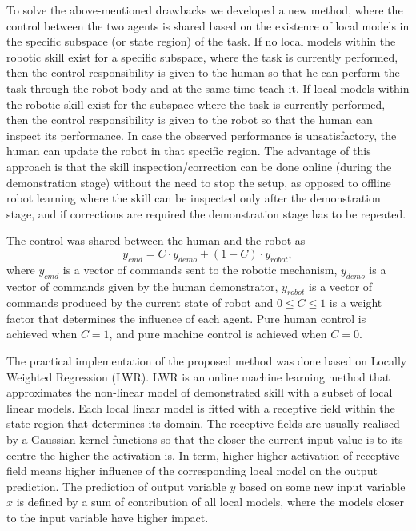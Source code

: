 To solve the above-mentioned drawbacks we developed a new method, where the control between the two agents is shared based on the existence of local models in the specific subspace (or state region) of the task. If no local models within the robotic skill exist for a specific subspace, where the task is currently performed, then the control responsibility is given to the human so that he can perform the task through the robot body and at the same time teach it. If local models within the robotic skill exist for the subspace where the task is currently performed, then the control responsibility is given to the robot so that the human can inspect its performance. In case the observed performance is unsatisfactory, the human can update the robot in that specific region. The advantage of this approach is that the skill inspection/correction can be done online (during the demonstration stage) without the need to stop the setup, as opposed to offline robot learning where the skill can be inspected only after the demonstration stage, and if corrections are required the demonstration stage has to be repeated.

The control was shared between the human and the robot as \cite{Peternel2013}
\begin{equation}
y_{cmd} = C \cdot y_{demo} + (1-C) \cdot y_{robot} ,
\label{eq:delegation}
\end{equation}
where $y_{cmd}$ is a vector of commands sent to the robotic mechanism, $y_{demo}$ is a vector of commands given by the human demonstrator, $y_{robot}$ is a vector of commands produced by the current state of robot and $0 \leq C \leq 1$ is a weight factor that determines the influence of each agent. Pure human control is achieved when $C = 1$, and pure machine control is achieved when $C = 0$.

The practical implementation of the proposed method was done based on Locally Weighted Regression (LWR)\cite{Schaal1998}. LWR is an online machine learning method that approximates the non-linear model of demonstrated skill with a subset of local linear models. Each local linear model is fitted with a receptive field within the state region that determines its domain. The receptive fields are usually realised by a Gaussian kernel functions so that the closer the current input value is to its centre the higher the activation is. In term, higher higher activation of receptive field means higher influence of the corresponding local model on the output prediction. The prediction of output variable $y$ based on some new input variable $x$ is defined by a sum of contribution of all local models, where the models closer to the input variable have higher impact.

